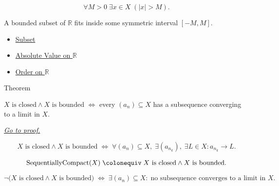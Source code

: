 \begin{remark*}
\[
  \forall M>0\;\exists x\in X\;(|x|>M).
\]
\end{remark*}

\begin{remark*}[Interpretation]
A bounded subset of $\mathbb{R}$ fits inside some symmetric interval
$[-M,M]$.
\end{remark*}

\begin{dependencies}
\begin{itemize}
  \item \hyperref[def:subset]{Subset}
  \item \hyperref[def:real-chapter-absolute-value-on-r]{Absolute Value on $\mathbb{R}$}
  \item \hyperref[def:order-on-r]{Order on $\mathbb{R}$}
\end{itemize}
\end{dependencies}


\begin{theorembox}{Theorem}
\begin{theorem}
\label{thm:heine-borel-subsets-real-line}
$X\text{ is closed} \wedge X\text{ is bounded}$
$\iff$ every $(a_n)\subseteq X$ has a subsequence converging to
a limit in $X$.

\smallskip\noindent
\hyperref[prf:heine-borel]{\textit{Go to proof.}}
\end{theorem}
\end{theorembox}

\begin{remark*}
\[
  X\text{ is closed} \wedge X\text{ is bounded}
  \;\iff\;
  \forall (a_n)\subseteq X,\;
  \exists (a_{n_k}),\;\exists L\in X : a_{n_k}\to L.
\]
\end{remark*}

\begin{remark*}
\[
  \operatorname{SequentiallyCompact}(X)
  \;\colonequiv\;
  X\text{ is closed} \wedge X\text{ is bounded}.
\]
\end{remark*}

\begin{remark*}
\[
  \neg\bigl(X\text{ is closed}\wedge X\text{ is bounded}\bigr)
  \;\iff\;
  \exists (a_n)\subseteq X:\;
  \text{no subsequence converges to a limit in } X.
\]
\end{remark*}

